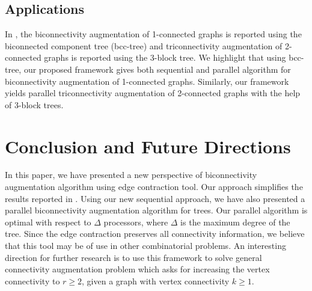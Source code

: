 \documentclass[runningheads]{llncs}
\begin{document}
\subsection{Applications}
In \cite{nsn}, the biconnectivity augmentation of 1-connected graphs is reported using the biconnected component tree (bcc-tree) and triconnectivity augmentation of 2-connected graphs is reported using the 3-block tree.  We highlight that using bcc-tree, our proposed framework gives both sequential and parallel algorithm for biconnectivity augmentation of 1-connected graphs.  Similarly, our framework yields parallel triconnectivity augmentation of 2-connected graphs with the help of 3-block trees.
\section{Conclusion and Future Directions}
In this paper, we have presented a new perspective of biconnectivity augmentation algorithm using edge contraction tool.  Our approach simplifies the results reported in \cite{nsn}.  Using our new sequential approach, we have also presented a parallel biconnectivity augmentation algorithm for trees.  Our parallel algorithm is optimal with respect to $\Delta$ processors, where $\Delta$ is the maximum degree of the tree.   Since the edge contraction preserves all connectivity information,  we believe that this tool may be of use in other combinatorial problems.  An interesting direction for further research is to use this framework to solve general connectivity augmentation problem which asks for increasing the vertex connectivity to $r \geq 2$, given a graph with vertex connectivity $k \geq 1$.
\end{document}

